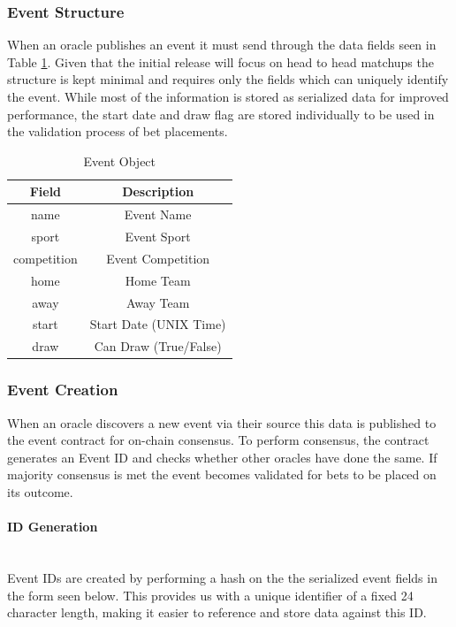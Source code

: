 \documentclass{article}
\newcommand{\myparagraph}[1]{\paragraph{#1}\mbox{}\\ \newline}
\begin{document}
		\subsubsection{Event Structure}
When an oracle publishes an event it must send through the data fields seen in Table \ref{table:events}. Given that the initial release will focus on head to head matchups the structure is kept minimal and requires only the fields which can uniquely identify the event. While most of the information is stored as serialized data for improved performance, the start date and draw flag are stored individually to be used in the validation process of bet placements.

\begin{table}[!htb]
\centering
\caption{Event Object}

\begin{tabular}{ c c }
\bfseries{Field} & \bfseries{Description} \\
\hline

name & Event Name \\
\hline
sport & Event Sport \\
\hline
competition & Event Competition \\
\hline
home & Home Team \\
\hline
away & Away Team \\
\hline
start & Start Date (UNIX Time) \\
\hline
draw & Can Draw (True/False) \\
\hline

\end{tabular}
\label{table:events}
\end{table}

		\subsubsection{Event Creation}
When an oracle discovers a new event via their source this data is published to the event contract for on-chain consensus. To perform consensus, the contract generates an Event ID and checks whether other oracles have done the same. If majority consensus is met the event becomes validated for bets to be placed on its outcome.

			\myparagraph{ID Generation}
Event IDs are created by performing a hash on the the serialized event fields in the form seen below. This provides us with a unique identifier of a fixed 24 character length, making it easier to reference and store data against this ID.
\end{document}
